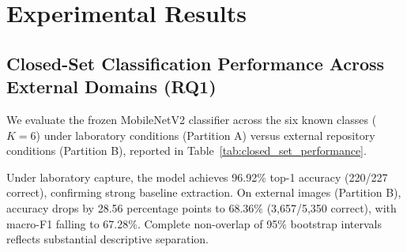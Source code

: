 \section{Experimental Results}
\label{sec:results}

\subsection{Closed-Set Classification Performance Across External Domains (RQ1)}
We evaluate the frozen MobileNetV2 classifier across the six known classes ($K = 6$) under laboratory conditions (Partition A) versus external repository conditions (Partition B), reported in Table~\ref{tab:closed_set_performance}.

\begin{table}[!t]
\caption{Closed-set classification performance of frozen MobileNetV2 across primary laboratory and external photographic domains. Brackets indicate 95\% non-parametric bootstrap percentile intervals ($B = 1,000$, seed 42).}
\label{tab:closed_set_performance}
\centering
\footnotesize
\setlength{\tabcolsep}{4.5pt}
\end{table}

Under laboratory capture, the model achieves 96.92\% top-1 accuracy (220/227 correct), confirming strong baseline extraction. On external images (Partition B), accuracy drops by 28.56 percentage points to 68.36\% (3,657/5,350 correct), with macro-F1 falling to 67.28\%. Complete non-overlap of 95\% bootstrap intervals reflects substantial descriptive separation. 

